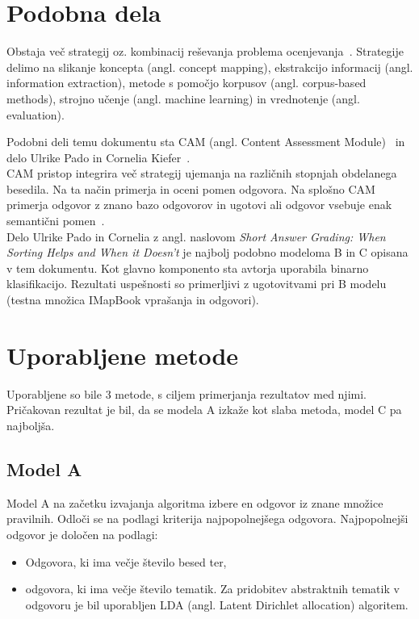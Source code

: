 \documentclass[journal]{IEEEtran}
\begin{document}
\section{Podobna dela}
Obstaja več strategij oz. kombinacij reševanja problema ocenjevanja~\cite{adhya2016automated}.
Strategije delimo na slikanje koncepta (angl. concept mapping), ekstrakcijo informacij (angl. information extraction), metode s pomočjo korpusov (angl. corpus-based methods), strojno učenje (angl. machine learning) in vrednotenje (angl. evaluation).

Podobni deli temu dokumentu sta CAM (angl. Content Assessment Module)~\cite{bailey2008content} in delo Ulrike Pado in Cornelia Kiefer~\cite{Kiefer}.\\

CAM pristop integrira več strategij ujemanja na različnih stopnjah obdelanega besedila. Na ta način primerja in oceni pomen odgovora.
Na splošno CAM primerja odgovor z znano bazo odgovorov in ugotovi ali odgovor vsebuje enak semantični pomen~\cite{bailey2008diagnosing}.\\

Delo Ulrike Pado in Cornelia z angl. naslovom \textit{Short Answer Grading: When Sorting Helps and When it Doesn’t} je najbolj podobno modeloma B in C opisana v tem dokumentu. Kot glavno komponento sta avtorja uporabila binarno klasifikacijo. Rezultati uspešnosti so primerljivi z ugotovitvami pri B modelu (testna množica IMapBook vprašanja in odgovori).

\section{Uporabljene metode}
Uporabljene so bile 3 metode, s ciljem primerjanja rezultatov med njimi. Pričakovan rezultat je bil, da se modela A izkaže kot slaba metoda, model C pa najboljša.

\subsection{Model A}
Model A na začetku izvajanja algoritma izbere en odgovor iz znane množice pravilnih. Odloči se na podlagi kriterija najpopolnejšega odgovora. Najpopolnejši odgovor je določen na podlagi:
\begin{itemize}
	\item Odgovora, ki ima večje število besed ter,
	\item odgovora, ki ima večje število tematik. Za pridobitev abstraktnih tematik v odgovoru je bil uporabljen LDA (angl. Latent Dirichlet allocation) algoritem.
\end{itemize}
\end{document}
